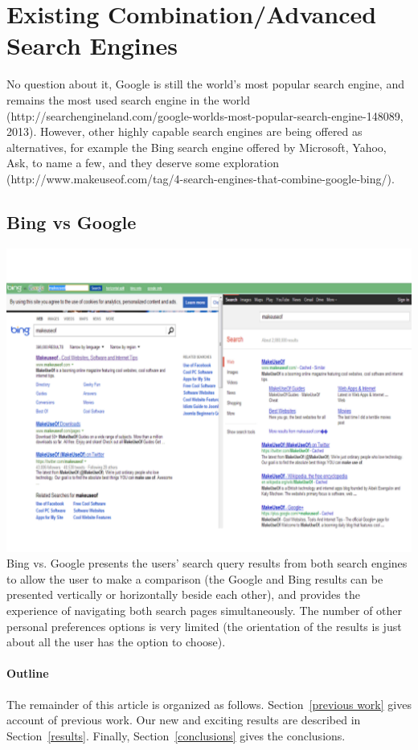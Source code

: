 \documentclass[11pt]{article}
\begin{document}
\section{Existing Combination/Advanced Search Engines}
No question about it, Google is still the world’s most popular search engine, and remains the most used search engine in the world (http://searchengineland.com/google-worlds-most-popular-search-engine-148089, 2013).  However, other highly capable search engines are being offered as alternatives, for example the Bing search engine offered by Microsoft, Yahoo, Ask, to name a few, and they deserve some exploration (http://www.makeuseof.com/tag/4-search-engines-that-combine-google-bing/).

\subsection{Bing vs Google}

\begin{center}
\includegraphics[scale =0.5]{bingG2}\\
Bing vs. Google presents the users’ search query results from both search engines to allow the user to make a comparison (the Google and Bing results can be presented vertically or horizontally beside each other), and provides the experience of navigating both search pages simultaneously.  The number of other personal preferences options is very limited (the orientation of the results is just about all the user has the option to choose).
\end{center}

\paragraph{Outline}
The remainder of this article is organized as follows.
Section~\ref{previous work} gives account of previous work.
Our new and exciting results are described in Section~\ref{results}.
Finally, Section~\ref{conclusions} gives the conclusions.
\end{document}
